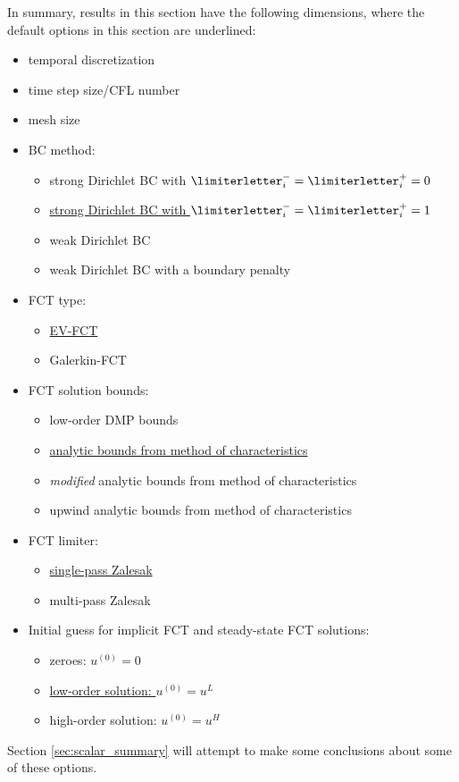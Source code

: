 In summary, results in this section have the following dimensions, where
the default options in this section are underlined:
\begin{itemize}
  \item temporal discretization
  \item time step size/CFL number
  \item mesh size
  \item BC method:
    \begin{itemize}
      \item strong Dirichlet BC with $\limiterletter_i^-=\limiterletter_i^+=0$
      \item \underline{strong Dirichlet BC with $\limiterletter_i^-=\limiterletter_i^+=1$}
      \item weak Dirichlet BC
      \item weak Dirichlet BC with a boundary penalty
    \end{itemize}
  \item FCT type:
    \begin{itemize}
      \item \underline{EV-FCT}
      \item Galerkin-FCT
    \end{itemize}
  \item FCT solution bounds:
    \begin{itemize}
      \item low-order DMP bounds
      \item \underline{analytic bounds from method of characteristics}
      \item \emph{modified} analytic bounds from method of characteristics
      \item upwind analytic bounds from method of characteristics
    \end{itemize}
  \item FCT limiter:
    \begin{itemize}
      \item \underline{single-pass Zalesak}
      \item multi-pass Zalesak
    \end{itemize}
  \item Initial guess for implicit FCT and steady-state FCT solutions:
    \begin{itemize}
      \item zeroes: $u^{(0)} = 0$
      \item \underline{low-order solution: $u^{(0)} = u^L$}
      \item high-order solution: $u^{(0)} = u^H$
    \end{itemize}
\end{itemize}

Section \ref{sec:scalar_summary} will attempt to make some conclusions about
some of these options.

